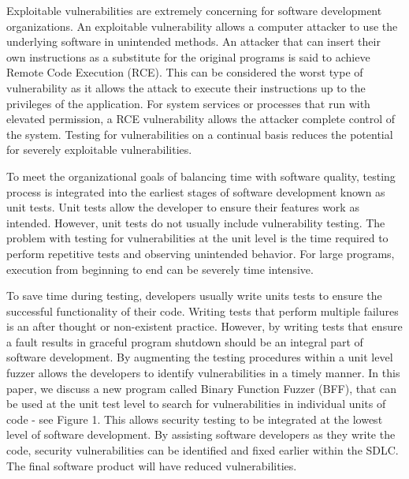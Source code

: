 \documentclass[conference]{IEEEtran}
\begin{document}
Exploitable vulnerabilities are extremely concerning for software development organizations. An exploitable vulnerability allows a computer attacker to use the underlying software in unintended methods. An attacker that can insert their own instructions as a substitute for the original programs is said to achieve Remote Code Execution (RCE). This can be considered the worst type of vulnerability as it allows the attack to execute their instructions up to the privileges of the application. For system services or processes that run with elevated permission, a RCE vulnerability allows the attacker complete control of the system. Testing for vulnerabilities on a continual basis reduces the potential for severely exploitable vulnerabilities.

To meet the organizational goals of balancing time with software quality, testing process is integrated into the earliest stages of software development known as unit tests. Unit tests allow the developer to ensure their features work as intended. However, unit tests do not usually include vulnerability testing. The problem with testing for vulnerabilities at the unit level is the time required to perform repetitive tests and observing unintended behavior. For large programs, execution from beginning to end can be severely time intensive. 

To save time during testing, developers usually write units tests to ensure the successful functionality of their code. Writing tests that perform multiple failures is an after thought or non-existent practice. However, by writing tests that ensure a fault results in graceful program shutdown should be an integral part of software development. By augmenting the testing procedures within a unit level fuzzer allows the developers to identify vulnerabilities in a timely manner. In this paper, we discuss a new program called Binary Function Fuzzer (BFF), that can be used at the unit test level to search for vulnerabilities in individual units of code - see Figure 1. This allows security testing to be integrated at the lowest level of software development. By assisting software developers as they write the code, security vulnerabilities can be identified and fixed earlier within the SDLC. The final software product will have reduced vulnerabilities.
\end{document}
